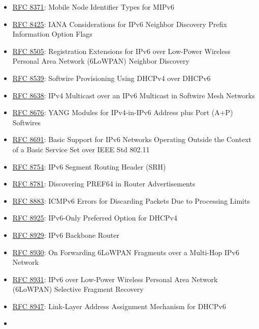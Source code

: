 \documentclass[
]{article}
\begin{document}
\begin{itemize}
  Adjustable Maximum Router Lifetimes per Link
\item
  \href{https://www.rfc-editor.org/info/rfc8371}{RFC 8371}: Mobile Node
  Identifier Types for MIPv6
\item
  \href{https://www.rfc-editor.org/info/rfc8425}{RFC 8425}: IANA
  Considerations for IPv6 Neighbor Discovery Prefix Information Option
  Flags
\item
  \href{https://www.rfc-editor.org/info/rfc8505}{RFC 8505}: Registration
  Extensions for IPv6 over Low-Power Wireless Personal Area Network
  (6LoWPAN) Neighbor Discovery
\item
  \href{https://www.rfc-editor.org/info/rfc8539}{RFC 8539}: Softwire
  Provisioning Using DHCPv4 over DHCPv6
\item
  \href{https://www.rfc-editor.org/info/rfc8638}{RFC 8638}: IPv4
  Multicast over an IPv6 Multicast in Softwire Mesh Networks
\item
  \href{https://www.rfc-editor.org/info/rfc8676}{RFC 8676}: YANG Modules
  for IPv4-in-IPv6 Address plus Port (A+P) Softwires
\item
  \href{https://www.rfc-editor.org/info/rfc8691}{RFC 8691}: Basic
  Support for IPv6 Networks Operating Outside the Context of a Basic
  Service Set over IEEE Std 802.11
\item
  \href{https://www.rfc-editor.org/info/rfc8754}{RFC 8754}: IPv6 Segment
  Routing Header (SRH)
\item
  \href{https://www.rfc-editor.org/info/rfc8781}{RFC 8781}: Discovering
  PREF64 in Router Advertisements
\item
  \href{https://www.rfc-editor.org/info/rfc8883}{RFC 8883}: ICMPv6
  Errors for Discarding Packets Due to Processing Limits
\item
  \href{https://www.rfc-editor.org/info/rfc8925}{RFC 8925}: IPv6-Only
  Preferred Option for DHCPv4
\item
  \href{https://www.rfc-editor.org/info/rfc8929}{RFC 8929}: IPv6
  Backbone Router
\item
  \href{https://www.rfc-editor.org/info/rfc8930}{RFC 8930}: On
  Forwarding 6LoWPAN Fragments over a Multi-Hop IPv6 Network
\item
  \href{https://www.rfc-editor.org/info/rfc8931}{RFC 8931}: IPv6 over
  Low-Power Wireless Personal Area Network (6LoWPAN) Selective Fragment
  Recovery
\item
  \href{https://www.rfc-editor.org/info/rfc8947}{RFC 8947}: Link-Layer
  Address Assignment Mechanism for DHCPv6
\item

\end{itemize}
\end{document}

